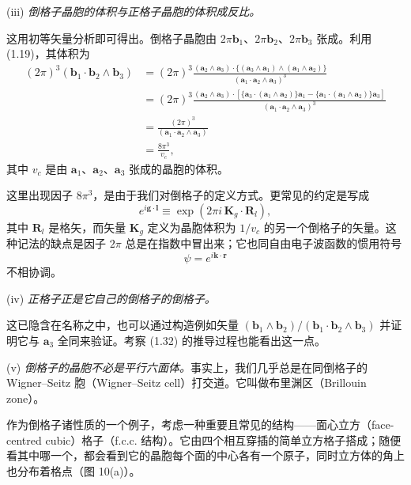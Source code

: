 (iii) \emph{倒格子晶胞的体积与正格子晶胞的体积成反比。}

这用初等矢量分析即可得出。倒格子晶胞由 $2\pi\mathbf{b}_1$、$2\pi\mathbf{b}_2$、$2\pi\mathbf{b}_3$ 张成。利用 (1.19)，其体积为
\begin{align*}
(2\pi)^3(\mathbf{b}_1\cdot\mathbf{b}_2\wedge\mathbf{b}_3)
&= (2\pi)^3
\frac{(\mathbf{a}_2\wedge\mathbf{a}_3)\cdot\{(\mathbf{a}_3\wedge\mathbf{a}_1)\wedge(\mathbf{a}_1\wedge\mathbf{a}_2)\}}
{(\mathbf{a}_1\cdot\mathbf{a}_2\wedge\mathbf{a}_3)^3} \\
&= (2\pi)^3
\frac{(\mathbf{a}_2\wedge\mathbf{a}_3)\cdot[\{\mathbf{a}_3\cdot(\mathbf{a}_1\wedge\mathbf{a}_2)\}\mathbf{a}_1 - \{\mathbf{a}_1\cdot(\mathbf{a}_1\wedge\mathbf{a}_2)\}\mathbf{a}_3]}
{(\mathbf{a}_1\cdot\mathbf{a}_2\wedge\mathbf{a}_3)^3} \\
&= \frac{(2\pi)^3}{(\mathbf{a}_1\cdot\mathbf{a}_2\wedge\mathbf{a}_3)} \\
&= \frac{8\pi^3}{v_c},
\tag{1.32}
\end{align*}
其中 $v_c$ 是由 $\mathbf{a}_1$、$\mathbf{a}_2$、$\mathbf{a}_3$ 张成的晶胞的体积。

这里出现因子 $8\pi^3$，是由于我们对倒格子的定义方式。更常见的约定是写成
\begin{equation*}
e^{i\boldsymbol{g}\cdot\boldsymbol{l}} \equiv \exp(2\pi i\,\mathbf{K}_g\cdot\mathbf{R}_l),
\tag{1.33}
\end{equation*}
其中 $\mathbf{R}_l$ 是格矢，而矢量 $\mathbf{K}_g$ 定义为晶胞体积为 $1/v_c$ 的另一个倒格子的矢量。这种记法的缺点是因子 $2\pi$ 总是在指数中冒出来；它也同自由电子波函数的惯用符号
\begin{equation*}
\psi = e^{i\mathbf{k}\cdot\mathbf{r}}
\tag{1.34}
\end{equation*}
不相协调。

(iv) \emph{正格子正是它自己的倒格子的倒格子。}

这已隐含在名称之中，也可以通过构造例如矢量 $(\mathbf{b}_1\wedge\mathbf{b}_2)/(\mathbf{b}_1\cdot\mathbf{b}_2\wedge\mathbf{b}_3)$ 并证明它与 $\mathbf{a}_3$ 全同来验证。考察 (1.32) 的推导过程也能看出这一点。

(v) \emph{倒格子的晶胞不必是平行六面体。}事实上，我们几乎总是在同倒格子的 Wigner--Seitz 胞（Wigner--Seitz cell）打交道。它叫做布里渊区（Brillouin zone）。

作为倒格子诸性质的一个例子，考虑一种重要且常见的结构——面心立方（face-centred cubic）格子（f.c.c. 结构）。它由四个相互穿插的简单立方格子搭成；随便看其中哪一个，都会看到它的晶胞每个面的中心各有一个原子，同时立方体的角上也分布着格点（图 10(a)）。

